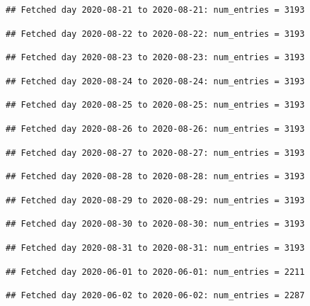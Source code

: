 \documentclass[]{article}
\begin{document}
\begin{verbatim}
## Fetched day 2020-08-21 to 2020-08-21: num_entries = 3193
\end{verbatim}

\begin{verbatim}
## Fetched day 2020-08-22 to 2020-08-22: num_entries = 3193
\end{verbatim}

\begin{verbatim}
## Fetched day 2020-08-23 to 2020-08-23: num_entries = 3193
\end{verbatim}

\begin{verbatim}
## Fetched day 2020-08-24 to 2020-08-24: num_entries = 3193
\end{verbatim}

\begin{verbatim}
## Fetched day 2020-08-25 to 2020-08-25: num_entries = 3193
\end{verbatim}

\begin{verbatim}
## Fetched day 2020-08-26 to 2020-08-26: num_entries = 3193
\end{verbatim}

\begin{verbatim}
## Fetched day 2020-08-27 to 2020-08-27: num_entries = 3193
\end{verbatim}

\begin{verbatim}
## Fetched day 2020-08-28 to 2020-08-28: num_entries = 3193
\end{verbatim}

\begin{verbatim}
## Fetched day 2020-08-29 to 2020-08-29: num_entries = 3193
\end{verbatim}

\begin{verbatim}
## Fetched day 2020-08-30 to 2020-08-30: num_entries = 3193
\end{verbatim}

\begin{verbatim}
## Fetched day 2020-08-31 to 2020-08-31: num_entries = 3193
\end{verbatim}

\begin{verbatim}
## Fetched day 2020-06-01 to 2020-06-01: num_entries = 2211
\end{verbatim}

\begin{verbatim}
## Fetched day 2020-06-02 to 2020-06-02: num_entries = 2287
\end{verbatim}
\end{document}
